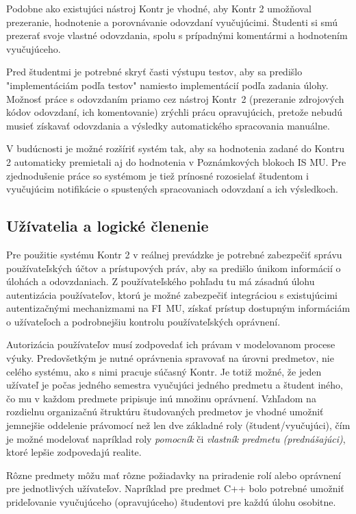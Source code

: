 \documentclass[
  digital, %
  twoside, %
  table,   %
  lof,     %
  lot,     %
]{fithesis3}
\begin{document}
Podobne ako existujúci nástroj Kontr je vhodné, aby Kontr 2 umožňoval prezeranie, hodnotenie a porovnávanie odovzdaní vyučujúcimi. Študenti si smú prezerať svoje vlastné odovzdania, spolu s prípadnými komentármi a hodnotením vyučujúceho. 

Pred študentmi je potrebné skryť časti výstupu testov, aby sa predišlo "implementáciám podľa testov" namiesto implementácií podľa zadania úlohy. Možnosť práce s odovzdaním priamo cez nástroj Kontr~2 (prezeranie zdrojových kódov odovzdaní, ich komentovanie) zrýchli prácu opravujúcich, pretože nebudú musieť získavať odovzdania a výsledky automatického spracovania manuálne. 

V budúcnosti je možné rozšíriť systém tak, aby sa hodnotenia zadané do Kontru 2 automaticky premietali aj do hodnotenia v Poznámkových blokoch IS MU. Pre zjednodušenie práce so systémom je tiež prínosné rozosielať študentom i vyučujúcim notifikácie o spustených spracovaniach odovzdaní a ich výsledkoch. 

\subsection{Užívatelia a logické členenie}

Pre použitie systému Kontr 2 v reálnej prevádzke je potrebné zabezpečiť správu používateľských účtov a prístupových práv, aby sa predišlo únikom informácií o úlohách a odovzdaniach. Z používateľského pohľadu tu má zásadnú úlohu autentizácia používateľov, ktorú je možné zabezpečiť integráciou s existujúcimi autentizačnými mechanizmami na FI~MU, získať prístup dostupným informáciám o užívateľoch a podrobnejšiu kontrolu používateľských oprávnení.

Autorizácia používateľov musí zodpovedať ich právam v modelovanom procese výuky. Predovšetkým je nutné oprávnenia spravovať na úrovni predmetov, nie celého systému, ako s nimi pracuje súčasný Kontr. Je totiž možné, že jeden užívateľ je počas jedného semestra vyučujúci jedného predmetu a študent iného, čo mu v každom predmete pripisuje inú množinu oprávnení. Vzhľadom na rozdielnu organizačnú štruktúru študovaných predmetov je vhodné umožniť jemnejšie oddelenie právomocí než len dve základné roly (študent/vyučujúci), čím je možné modelovať napríklad roly \emph{pomocník} či \emph{vlastník predmetu (prednášajúci)}, ktoré lepšie zodpovedajú realite.

Rôzne predmety môžu mať rôzne požiadavky na priradenie rolí alebo oprávnení pre jednotlivých užívateľov. Napríklad pre predmet C++ bolo potrebné umožniť prideľovanie vyučujúceho (opravujúceho) študentovi pre každú úlohu osobitne.
\end{document}
